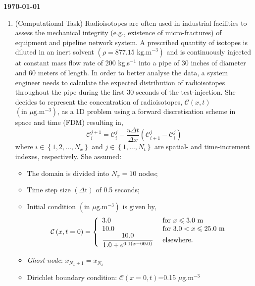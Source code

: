 \documentclass[12pts,a4paper,amsmath,amssymb,floatfix]{article}%
\renewcommand\le{\leqslant}
\begin{document}
\begin{flushright}
{\bf \today}
\end{flushright}

\begin{enumerate}[{\bf Problem 1:}]
%
\item (Computational Task) Radioisotopes are often used in industrial facilities to assess the mechanical integrity (e.g., existence of micro-fractures) of equipment and pipeline network system. A prescribed quantity of isotopes is diluted in an inert solvent $\left(\rho=\text{877.15 kg.m}^{-3}\right)$ and is continuously injected at constant mass flow rate of 200 kg.s$^{-1}$ into a pipe of 30 inches of diameter and 60 meters of length.  In order to better analyse the data, a system engineer needs to calculate the expected distribution of radioisotopes throughout the pipe during the first 30 seconds of the test-injection. She decides to represent the concentration of radioisotopes, $\mathcal{C}\left(x,t\right)$ $\left(\text{in }\mu\text{g.m}^{-3}\right)$, as a 1D problem using a forward discretisation scheme in space and time (FDM) resulting in,
\begin{displaymath}
\mathcal{C}_{i}^{j+1}=\mathcal{C}_{i}^{j} - \frac{u\Delta t}{\Delta x }\left(\mathcal{C}_{i+1}^{j}-\mathcal{C}_{i}^{j}\right)
\end{displaymath}
where $i\in\left\{1,2,...,N_{x}\right\}$ and $j\in\left\{1,...,N_{t}\right\}$ are spatial- and time-increment indexes, respectively. She assumed:
\begin{itemize}
\item The domain is divided into $N_{x}=10$ nodes;
\item Time step size $\left(\Delta\text{t}\right)$ of 0.5 seconds;
\item Initial condition $\left(\text{in }\mu\text{g.m}^{-3}\right)$ is given by,
\[
\mathcal{C}\left(x,t=0\right)=
\left\{\begin{array}{l l}
3.0 & \text{ for }  x \le 3.0 \text{ m }\\
10.0 & \text{ for }  3.0 < x \le 25.0 \text{ m} \\
\displaystyle\frac{10.0}{1.0 + e^{0.1\left(x-60.0\right)}}  & \text{ elsewhere.}
\end{array}\right.\]
\item {\it Ghost-node}: $x_{N_{x}+1}=x_{N_{x}}$
\item Dirichlet boundary condition: $\mathcal{C}\left(x=0,t\right)$=0.15 $\mu$g.m$^{-3}$
\end{itemize}
\begin{enumerate}

\end{enumerate}
\end{enumerate}
\end{document}
